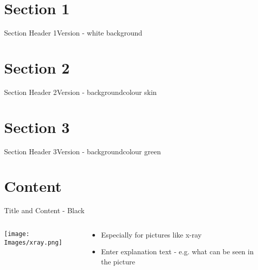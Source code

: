 \documentclass[10pt,compress]{beamer} %
\begin{document}
\section{Section 1}
{
\sectionheaderWhite %
\begin{frame}{Section Header 1}{Version - white background}
\end{frame}

}

\section{Section 2}
{
\sectionheaderSkin %
\begin{frame}{Section Header 2}{Version - backgroundcolour skin}
\end{frame}
}

\section{Section 3}
{
\sectionheaderGreen %
\begin{frame}{Section Header 3}{Version - backgroundcolour green}
\end{frame}
}

\section{Content}
{\blackSlide %
\begin{frame}{Title and Content - Black}
\begin{columns}
  \begin{column}{0.3\textwidth}
    \begin{center}
     \texttt{[image: Images/xray.png]}
     \end{center}
  \end{column}
  \begin{column}{0.7\textwidth}  %
    \begin{itemize}
	  \item Especially for pictures like x-ray
	  \item Enter explanation text - e.g. what can be seen in the picture
	\end{itemize}
  \end{column}
\end{columns}

\end{frame}
}
\end{document}
